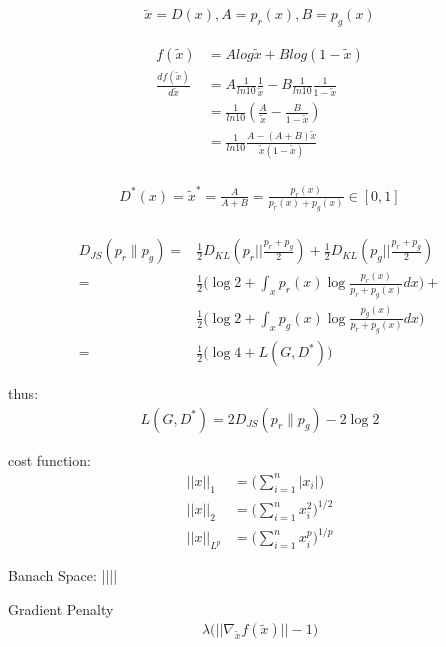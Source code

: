 \documentclass[letterpaper]{article} %
\begin{document}
	\begin{align*}
	\tilde{x} = D(x), A=p_{r}(x), B=p_g(x)
	\end{align*}
	
	\begin{align*}
f(\tilde{x}) 
& = A log\tilde{x} + B log(1-\tilde{x}) \\
\frac{d f(\tilde{x})}{d \tilde{x}}
& = A \frac{1}{ln10} \frac{1}{\tilde{x}} - B \frac{1}{ln10} \frac{1}{1 - \tilde{x}} \\
& = \frac{1}{ln10} (\frac{A}{\tilde{x}} - \frac{B}{1-\tilde{x}}) \\
& = \frac{1}{ln10} \frac{A - (A + B)\tilde{x}}{\tilde{x} (1 - \tilde{x})} \\
\end{align*}

\begin{align*}
D^*(x) = \tilde{x}^* = \frac{A}{A + B} = \frac{p_{r}(x)}{p_{r}(x) + p_g(x)} \in [0, 1] \\
\end{align*}

\begin{align*}
D_{JS}(p_{r} \| p_g) 
=& \frac{1}{2} D_{KL}(p_{r} || \frac{p_{r} + p_g}{2}) + \frac{1}{2} D_{KL}(p_{g} || \frac{p_{r} + p_g}{2}) \\
=& \frac{1}{2} \bigg( \log2 + \int_x p_{r}(x) \log \frac{p_{r}(x)}{p_{r} + p_g(x)} dx \bigg) + \\& \frac{1}{2} \bigg( \log2 + \int_x p_g(x) \log \frac{p_g(x)}{p_{r} + p_g(x)} dx \bigg) \\
=& \frac{1}{2} \bigg( \log4 + L(G, D^*) \bigg)
\end{align*}

thus:
\begin{align*}
L(G, D^*) = 2D_{JS}(p_{r} \| p_g) - 2\log2
\end{align*}


cost function:
\begin{align*}
||x||_1 &= \big(\sum_{i=1}^n|x_i|\big) \\
||x||_2 &= \big(\sum_{i=1}^nx_i^2\big)^{1/2} \\
||x||_{L^p} &= \big(\sum_{i=1}^nx_i^p\big)^{1/p}
\end{align*}

Banach Space:
||||
	
	
Gradient Penalty
\begin{align*}
\lambda \big(||\nabla_{\tilde x}f(\tilde x)||-1 \big)
\end{align*}
\end{document}
